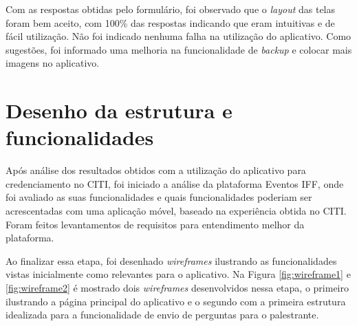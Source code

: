 Com as respostas obtidas pelo formulário, foi observado que o \textit{layout} das telas foram bem aceito, com 100\% das respostas indicando que eram intuitivas e de fácil utilização. Não foi indicado nenhuma falha na utilização do aplicativo. Como sugestões, foi informado uma melhoria na funcionalidade de \textit{backup} e colocar mais imagens no aplicativo.

\section{Desenho da estrutura e funcionalidades}

Após análise dos resultados obtidos com a utilização do aplicativo para credenciamento no CITI, foi iniciado a análise da plataforma Eventos IFF, onde foi avaliado as suas funcionalidades e quais funcionalidades poderiam ser acrescentadas com uma aplicação móvel, baseado na experiência obtida no CITI. Foram feitos levantamentos de requisitos para entendimento melhor da plataforma. 

Ao finalizar essa etapa, foi desenhado \textit{wireframes} ilustrando as funcionalidades vistas inicialmente como relevantes para o aplicativo. Na Figura \ref{fig:wireframe1} e \ref{fig:wireframe2} é mostrado dois \textit{wireframes} desenvolvidos nessa etapa, o primeiro ilustrando a página principal do aplicativo e o segundo com a primeira estrutura idealizada para a funcionalidade de envio de perguntas para o palestrante.


